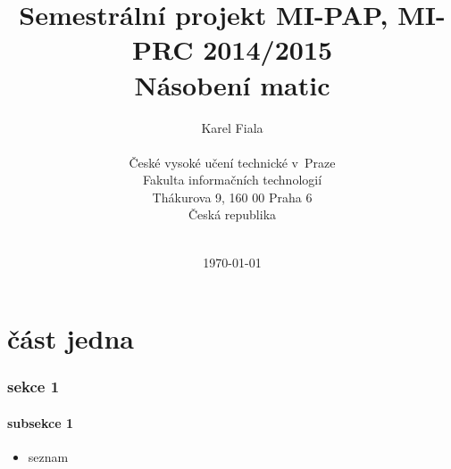 \documentclass[12pt,a4paper]{article}
\begin{document}
\title{Semestrální projekt MI-PAP, MI-PRC 2014/2015\\
Násobení matic \\
\vspace{10px}}
\author{Karel Fiala \\
\vspace{10px} \\
\small České vysoké učení technické v~Praze\\
\small Fakulta informačních technologií\\
\small Thákurova 9, 160 00 Praha 6\\
\small Česká republika \\
\vspace{10px} \\
}
\date{\today}
\maketitle
\thispagestyle{empty}


\clearpage
\thispagestyle{empty}
\tableofcontents
\clearpage

%


\part*{část jedna}						%
\pagebreak


\section{sekce 1}
\subsection{subsekce 1}


\begin{itemize}
\item seznam
\end{itemize}
\end{document}
